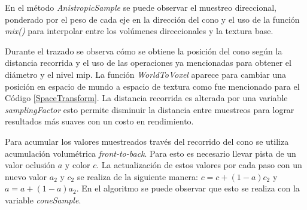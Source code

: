 En el método \emph{AnistropicSample} se puede observar el muestreo direccional, ponderado por el peso de cada eje en la dirección del cono y el uso de la función \emph{mix()} para interpolar entre los volúmenes direccionales y la textura base. 

Durante el trazado se observa cómo se obtiene la posición del cono según la distancia recorrida y el uso de las operaciones ya mencionadas para obtener el diámetro y el nivel mip. La función \emph{WorldToVoxel} aparece para cambiar una posición en espacio de mundo a espacio de textura como fue mencionado para el Código \ref{SpaceTransform}. La distancia recorrida es alterada por una variable \emph{samplingFactor} esto permite disminuir la distancia entre muestreos para lograr resultados más suaves con un costo en rendimiento.

Para acumular los valores muestreados través del recorrido del cono se utiliza acumulación volumétrica \emph{front-to-back}. Para esto es necesario llevar pista de un valor oclusión $a$ y color $c$. La actualización de estos valores por cada paso con un nuevo valor $a_2$ y $c_2$ se realiza de la siguiente manera: $c=c+(1-a)c_2$ y $a=a+(1-a)a_2$. En el algoritmo se puede observar que esto se realiza con la variable \emph{coneSample}.

